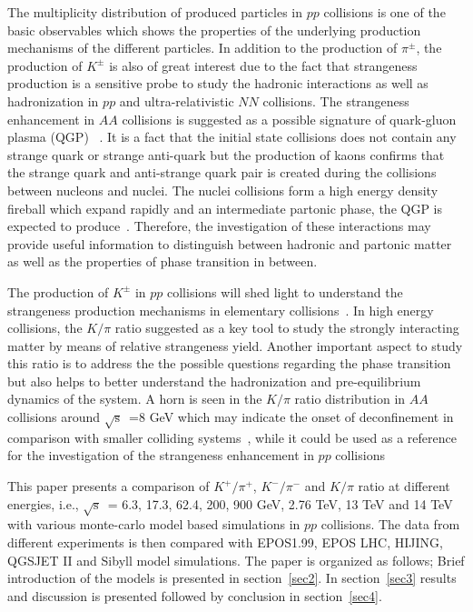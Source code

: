 \documentclass{article}
\newcommand{\sqrts}{\mbox{$\sqrt{\mathrm{s}}$}}
\begin{document}
The multiplicity distribution of produced particles in $pp$ collisions is one of the basic observables which shows the properties of the underlying production mechanisms of the different particles. In addition to the production of $\pi^\pm$, the production of $K^\pm$ is also of great interest due to the fact that strangeness production is a sensitive probe to study the hadronic interactions as well as hadronization in $pp$ and ultra-relativistic $NN$ collisions. The strangeness enhancement in $AA$ collisions is suggested as a possible signature of quark-gluon plasma (QGP) ~\cite{5}. It is a fact that the initial state collisions does not contain any strange quark or strange anti-quark but the production of kaons confirms that the strange quark and anti-strange quark pair is created during the collisions between nucleons and nuclei. The nuclei collisions form a high energy density fireball which expand rapidly and an intermediate partonic phase, the QGP is expected to produce~\cite{6}. Therefore, the investigation of these interactions may provide useful information to distinguish between hadronic and partonic matter as well as the properties of phase transition in between.

The production of $K^\pm$ in $pp$ collisions will shed light to understand the strangeness production mechanisms in elementary collisions~\cite{5}. In high energy collisions, the $K/\pi$ ratio suggested as a key tool to study the strongly interacting matter by means of relative strangeness yield. Another important aspect to study this ratio is to address the the possible questions regarding the phase transition but also helps to better understand the hadronization and pre-equilibrium dynamics of the system. A horn is seen in the $K/\pi$ ratio distribution in $AA$ collisions around \sqrts~=8 GeV which may indicate the onset of deconfinement in comparison with smaller colliding systems~\cite{7}, while it could be used as a reference for the investigation of the strangeness enhancement in $pp$ collisions


This paper presents a comparison of $K^+/\pi^+$, $K^-/\pi^-$ and $K/\pi$ ratio at different energies, i.e., \sqrts~= 6.3, 17.3, 62.4, 200, 900 GeV, 2.76 TeV, 13 TeV and 14 TeV with various monte-carlo model based simulations in $pp$ collisions. The data from different experiments is then compared with EPOS1.99, EPOS LHC, HIJING, QGSJET II and Sibyll model simulations. The paper is organized as follows; Brief introduction of the models is presented in section~\ref{sec2}. In section~\ref{sec3} results and discussion is presented followed by conclusion in section~\ref{sec4}.   
\end{document}
